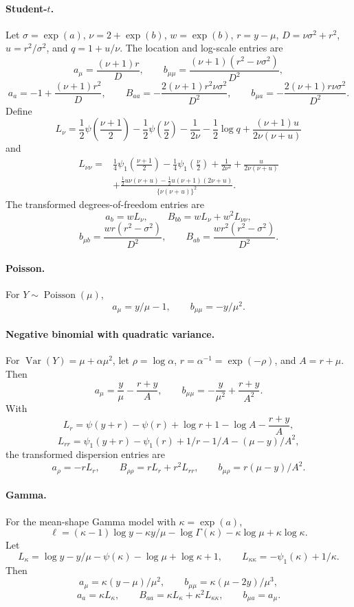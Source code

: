 \documentclass[a4paper,fleqn]{cas-sc}
\DeclareMathOperator{\Var}{Var}
\begin{document}
\paragraph{Student-$t$.}
Let $\sigma=\exp(a)$, $\nu=2+\exp(b)$, $w=\exp(b)$, $r=y-\mu$, $D=\nu\sigma^2+r^2$, $u=r^2/\sigma^2$, and $q=1+u/\nu$. The location and log-scale entries are
\[
 a_\mu=\frac{(\nu+1)r}{D},\qquad
 b_{\mu\mu}=\frac{(\nu+1)(r^2-\nu\sigma^2)}{D^2},
\]
\[
 a_a=-1+\frac{(\nu+1)r^2}{D},\qquad
 B_{aa}=-\frac{2(\nu+1)r^2\nu\sigma^2}{D^2},\qquad
 b_{\mu a}=-\frac{2(\nu+1)r\nu\sigma^2}{D^2}.
\]
Define
\[
 L_\nu=\frac12\psi\!\left(\frac{\nu+1}{2}\right)
 -\frac12\psi\!\left(\frac\nu2\right)-\frac{1}{2\nu}
 -\frac12\log q+\frac{(\nu+1)u}{2\nu(\nu+u)}
\]
and
\[
 \begin{split}
 L_{\nu\nu}={}&\frac14\psi_1\!\left(\frac{\nu+1}{2}\right)
 -\frac14\psi_1\!\left(\frac\nu2\right)+\frac{1}{2\nu^2}
 +\frac{u}{2\nu(\nu+u)}\\
 &+\frac{\tfrac12u\nu(\nu+u)-\tfrac12u(\nu+1)(2\nu+u)}
 {\{\nu(\nu+u)\}^2}.
 \end{split}
\]
The transformed degrees-of-freedom entries are
\[
 a_b=wL_\nu,\qquad B_{bb}=wL_\nu+w^2L_{\nu\nu},
\]
\[
 b_{\mu b}=\frac{w r(r^2-\sigma^2)}{D^2},\qquad
 B_{ab}=\frac{w r^2(r^2-\sigma^2)}{D^2}.
\]

\paragraph{Poisson.}
For $Y\sim\operatorname{Poisson}(\mu)$,
\[
 a_\mu=y/\mu-1,\qquad b_{\mu\mu}=-y/\mu^2.
\]

\paragraph{Negative binomial with quadratic variance.}
For $\Var(Y)=\mu+\alpha\mu^2$, let $\rho=\log\alpha$, $r=\alpha^{-1}=\exp(-\rho)$, and $A=r+\mu$. Then
\[
 a_\mu=\frac{y}{\mu}-\frac{r+y}{A},\qquad
 b_{\mu\mu}=-\frac{y}{\mu^2}+\frac{r+y}{A^2}.
\]
With
\[
 L_r=\psi(y+r)-\psi(r)+\log r+1-\log A-\frac{r+y}{A},
\]
\[
 L_{rr}=\psi_1(y+r)-\psi_1(r)+1/r-1/A-(\mu-y)/A^2,
\]
the transformed dispersion entries are
\[
 a_\rho=-rL_r,\qquad B_{\rho\rho}=rL_r+r^2L_{rr},\qquad
 b_{\mu\rho}=r(\mu-y)/A^2.
\]

\paragraph{Gamma.}
For the mean-shape Gamma model with $\kappa=\exp(a)$,
\[
 \ell=(\kappa-1)\log y-\kappa y/\mu-\log\Gamma(\kappa)
 -\kappa\log\mu+\kappa\log\kappa.
\]
Let
\[
 L_\kappa=\log y-y/\mu-\psi(\kappa)-\log\mu+\log\kappa+1,
 \qquad L_{\kappa\kappa}=-\psi_1(\kappa)+1/\kappa.
\]
Then
\[
 a_\mu=\kappa(y-\mu)/\mu^2,\qquad
 b_{\mu\mu}=\kappa(\mu-2y)/\mu^3,
\]
\[
 a_a=\kappa L_\kappa,\qquad
 B_{aa}=\kappa L_\kappa+\kappa^2L_{\kappa\kappa},\qquad
 b_{\mu a}=a_\mu.
\]
\end{document}
